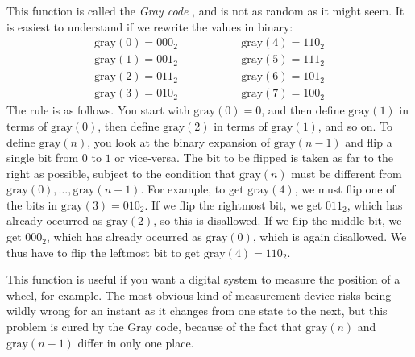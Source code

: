 \documentclass[a4paper]{book}
\newcommand{\PURPLE}[1]{{\color{purple}#1}}
\renewcommand{\:}{\colon}
\newcommand{\mathworld}[1]{}
\newcommand{\DEFN}[1]{\PURPLE{\emph{#1}}}
\theoremstyle{definition}
\begin{document}
\begin{background}
 This function is called the \DEFN{Gray code} \mathworld{GrayCode},
 and is not as random as it might seem.  It is easiest to understand
 if we rewrite the values in binary:
 \[ \begin{array}{lll}
     \text{gray}(0) = 000_2 & \hspace{4em} & \text{gray}(4) = 110_2 \\
     \text{gray}(1) = 001_2 &              & \text{gray}(5) = 111_2 \\
     \text{gray}(2) = 011_2 &              & \text{gray}(6) = 101_2 \\
     \text{gray}(3) = 010_2 &              & \text{gray}(7) = 100_2
    \end{array}
 \]
 The rule is as follows.  You start with $\text{gray}(0)=0$, and then
 define $\text{gray}(1)$ in terms of $\text{gray}(0)$, then define
 $\text{gray}(2)$ in terms of $\text{gray}(1)$, and so on.  To define
 $\text{gray}(n)$, you look at the binary expansion of
 $\text{gray}(n-1)$ and flip a single bit from $0$ to $1$ or
 vice-versa.  The bit to be flipped is taken as far to the right as
 possible, subject to the condition that $\text{gray}(n)$ must be
 different from $\text{gray}(0),\ldots,\text{gray}(n-1)$.  For
 example, to get $\text{gray}(4)$, we must flip one of the bits in
 $\text{gray}(3)=010_2$.  If we flip the rightmost bit, we get
 $011_2$, which has already occurred as $\text{gray}(2)$, so this is
 disallowed.  If we flip the middle bit, we get $000_2$, which has
 already occurred as $\text{gray}(0)$, which is again disallowed.  We
 thus have to flip the leftmost bit to get $\text{gray}(4)=110_2$.
 
 This function is useful if you want a digital system to measure the
 position of a wheel, for example.  The most obvious kind of
 measurement device risks being wildly wrong for an instant as it
 changes from one state to the next, but this problem is cured by the
 Gray code, because of the fact that $\text{gray}(n)$ and
 $\text{gray}(n-1)$ differ in only one place.
\end{background}
\end{document}
